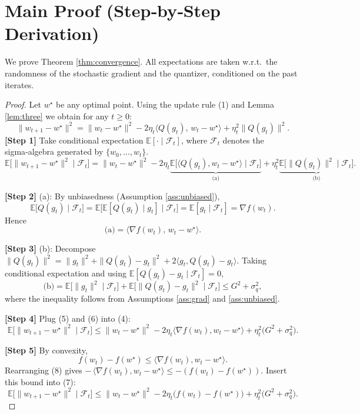 \documentclass{article}
\newcommand{\E}{\mathbb{E}}
\begin{document}
\section*{Main Proof (Step‑by‑Step Derivation)}
We prove Theorem \ref{thm:convergence}.  
All expectations are taken w.r.t.\ the randomness of the stochastic gradient and the quantizer, conditioned on the past iterates.

\begin{proof}
Let $w^{\star}$ be any optimal point. Using the update rule (1) and Lemma \ref{lem:three} we obtain for any $t\ge0$:
\[
\|w_{t+1}-w^{\star}\|^{2}
= \|w_{t}-w^{\star}\|^{2}
-2\eta_t\langle Q(g_t),\,w_{t}-w^{\star}\rangle
+\eta_t^{2}\|Q(g_t)\|^{2}.
\tag{3}
\]
\textbf{[Step 1]} Take conditional expectation $\E[\cdot\mid \mathcal{F}_t]$, where $\mathcal{F}_t$ denotes the sigma‑algebra generated by $\{w_0,\dots,w_t\}$.
\[
\E\!\big[\|w_{t+1}-w^{\star}\|^{2}\mid\mathcal{F}_t\big]
= \|w_{t}-w^{\star}\|^{2}
-2\eta_t\underbrace{\E\!\big[\langle Q(g_t),w_{t}-w^{\star}\rangle\mid\mathcal{F}_t\big]}_{\text{(a)}}
+\eta_t^{2}\underbrace{\E\!\big[\|Q(g_t)\|^{2}\mid\mathcal{F}_t\big]}_{\text{(b)}}.
\tag{4}
\]

\textbf{[Step 2]} (a): By unbiasedness (Assumption \ref{ass:unbiased}),
\[
\E\!\big[Q(g_t)\mid\mathcal{F}_t\big]=\E\!\big[\E[Q(g_t)\mid g_t]\mid\mathcal{F}_t\big]=\E[g_t\mid\mathcal{F}_t]=\nabla f(w_t).
\]
Hence
\[
\text{(a)} = \langle \nabla f(w_t),\,w_{t}-w^{\star}\rangle .
\tag{5}
\]

\textbf{[Step 3]} (b): Decompose $\|Q(g_t)\|^{2}= \|g_t\|^{2}+ \|Q(g_t)-g_t\|^{2}+2\langle g_t,Q(g_t)-g_t\rangle$.
Taking conditional expectation and using $\E[Q(g_t)-g_t\mid\mathcal{F}_t]=0$,
\[
\text{(b)} = \E\!\big[\|g_t\|^{2}\mid\mathcal{F}_t\big] + \E\!\big[\|Q(g_t)-g_t\|^{2}\mid\mathcal{F}_t\big]
\le G^{2}+ \sigma_{q}^{2},
\tag{6}
\]
where the inequality follows from Assumptions \ref{ass:grad} and \ref{ass:unbiased}.

\textbf{[Step 4]} Plug (5) and (6) into (4):
\[
\E\!\big[\|w_{t+1}-w^{\star}\|^{2}\mid\mathcal{F}_t\big]
\le \|w_{t}-w^{\star}\|^{2}
-2\eta_t\langle \nabla f(w_t),w_{t}-w^{\star}\rangle
+\eta_t^{2}\big(G^{2}+ \sigma_{q}^{2}\big).
\tag{7}
\]

\textbf{[Step 5]} By convexity,
\[
f(w_t)-f(w^{\star})\le \langle\nabla f(w_t),w_t-w^{\star}\rangle .
\tag{8}
\]
Rearranging (8) gives $-\,\langle\nabla f(w_t),w_t-w^{\star}\rangle\le -(f(w_t)-f(w^{\star}))$.
Insert this bound into (7):
\[
\E\!\big[\|w_{t+1}-w^{\star}\|^{2}\mid\mathcal{F}_t\big]
\le \|w_{t}-w^{\star}\|^{2}
-2\eta_t\big(f(w_t)-f(w^{\star})\big)
+\eta_t^{2}\big(G^{2}+ \sigma_{q}^{2}\big).
\tag{9}
\]


\end{proof}
\end{document}
